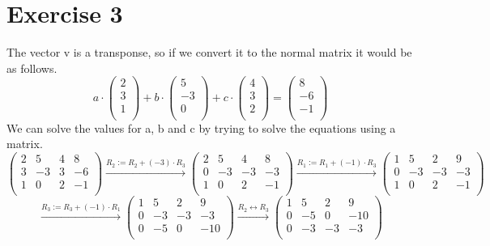 \documentclass[a4paper]{article}
\begin{document}
\section*{Exercise 3}
The vector v is a transponse, so if we convert it to the normal matrix it would be as follows.
\[
a \cdot
\left(
\begin{array}{c}
2 \\
3 \\
1 \\
\end{array}
\right)
+ b \cdot
\left(
\begin{array}{c}
5 \\
-3 \\
0 \\
\end{array}
\right)
+ c \cdot
\left(
\begin{array}{c}
4 \\
3 \\
2 \\
\end{array}
\right)
=
\left(
\begin{array}{c}
8 \\
-6 \\
- 1 \\
\end{array}
\right)
\]
We can solve the values for a, b and c by trying to solve the equations using a matrix.
\[
\left(
\begin{array}{ccc|c}
2 & 5 & 4 & 8 \\
3 & -3 & 3 & -6 \\
1 & 0 & 2 & -1 \\
\end{array}
\right)
\xrightarrow{\text{$R_2 := R_2 + (-3) \cdot R_3$}}
\left(
\begin{array}{ccc|c}
2 & 5 & 4 & 8 \\
0 & -3 & -3 & -3 \\
1 & 0 & 2 & -1 \\
\end{array}
\right)
\xrightarrow{\text{$R_1 := R_1 + (-1) \cdot R_3$}}
\left(
\begin{array}{ccc|c}
1 & 5 & 2 & 9 \\
0 & -3 & -3 & -3 \\
1 & 0 & 2 & -1 \\
\end{array}
\right)
\]
\[
\xrightarrow{\text{$R_3 := R_3 + (-1) \cdot R_1$}}
\left(
\begin{array}{ccc|c}
1 & 5 & 2 & 9 \\
0 & -3 & -3 & -3 \\
0 & -5 & 0 & -10 \\
\end{array}
\right)
\xrightarrow{\text{$R_2 \leftrightarrow R_3$}}
\left(
\begin{array}{ccc|c}
1 & 5 & 2 & 9 \\
0 & -5 & 0 & -10 \\
0 & -3 & -3 & -3 \\
\end{array}
\right)
\]
\end{document}
